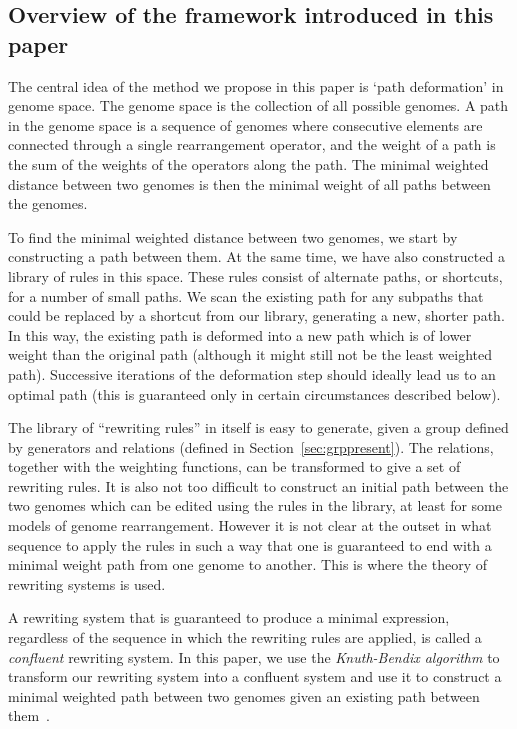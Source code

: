 \documentclass[utf8]{Frontiers_LaTex_Templates/frontiersFPHY} %
\numberwithin{equation}{section}
\begin{document}
\subsection*{Overview of the framework introduced in this paper}

The central idea of the method we propose in this paper is `path deformation' in genome space.  The genome space is the collection of all possible genomes. A path in the genome space is a sequence of genomes where consecutive elements are connected through a single rearrangement operator, and the weight of a path is the sum of the weights of the operators along the path. The minimal weighted distance between two genomes is then the minimal weight of all paths between the genomes. 

To find the minimal weighted distance between two genomes, we start by constructing a path between them.  At the same time, we have also constructed a library of rules in this space. These rules consist of alternate paths, or shortcuts, for a number of small paths. We scan the existing path for any subpaths that could be replaced by a shortcut from our library, generating a new, shorter path. In this way, the existing path is deformed into a new path which is of lower weight than the original path (although it might still not be the least weighted path). Successive iterations of the deformation step should ideally lead us to an optimal path (this is guaranteed only in certain circumstances described below).

The library of ``rewriting rules'' in itself is easy to generate, given a group defined by generators and relations (defined in Section~\ref{sec:grppresent}).  The relations, together with the weighting functions, can be transformed to give a set of rewriting rules.  It is also not too difficult to construct an initial path between the two genomes which can be edited using the rules in the library, at least for some models of genome rearrangement. However it is not clear at the outset in what sequence to apply the rules in such a way that one is guaranteed to end with a minimal weight path from one genome to another. This is where the theory of rewriting systems is used.  

A rewriting system that is guaranteed to produce a minimal expression, regardless of the sequence in which the rewriting rules are applied, is called a \emph{confluent} rewriting system.  In this paper, we use the \emph{Knuth-Bendix algorithm}  to transform our rewriting system into a confluent system and use it to construct a minimal weighted path between two genomes given an existing path between them~\citep{knuth1983simple}.
\end{document}
